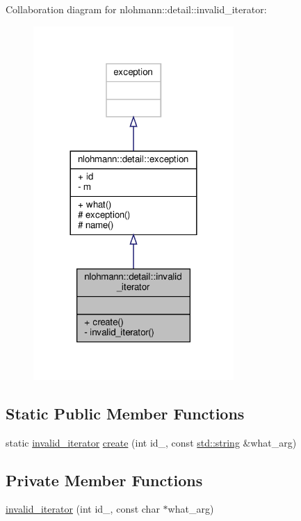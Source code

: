 Collaboration diagram for nlohmann\+:\+:detail\+:\+:invalid\+\_\+iterator\+:
\nopagebreak
\begin{figure}[H]
\begin{center}
\leavevmode
\includegraphics[width=216pt]{classnlohmann_1_1detail_1_1invalid__iterator__coll__graph}
\end{center}
\end{figure}
\subsection*{Static Public Member Functions}
\begin{DoxyCompactItemize}
\item 
static \hyperlink{classnlohmann_1_1detail_1_1invalid__iterator}{invalid\+\_\+iterator} \hyperlink{classnlohmann_1_1detail_1_1invalid__iterator_a4e849260a3caa1b288c7e619130c6c09}{create} (int id\+\_\+, const \hyperlink{namespacenlohmann_1_1detail_a1ed8fc6239da25abcaf681d30ace4985ab45cffe084dd3d20d928bee85e7b0f21}{std\+::string} \&what\+\_\+arg)
\end{DoxyCompactItemize}
\subsection*{Private Member Functions}
\begin{DoxyCompactItemize}
\item 
\hyperlink{classnlohmann_1_1detail_1_1invalid__iterator_adf4a6697420f3bddb4addfc0b98f6ee2}{invalid\+\_\+iterator} (int id\+\_\+, const char $\ast$what\+\_\+arg)
\end{DoxyCompactItemize}
